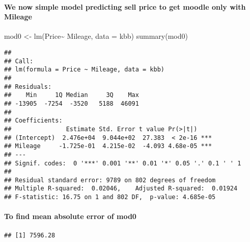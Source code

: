 \documentclass[
]{article}
\newenvironment{Shaded}{\begin{snugshade}}{\end{snugshade}}
\newcommand{\AttributeTok}[1]{\textcolor[rgb]{0.77,0.63,0.00}{#1}}
\newcommand{\FunctionTok}[1]{\textcolor[rgb]{0.00,0.00,0.00}{#1}}
\newcommand{\NormalTok}[1]{#1}
\newcommand{\OtherTok}[1]{\textcolor[rgb]{0.56,0.35,0.01}{#1}}
\newcommand{\SpecialCharTok}[1]{\textcolor[rgb]{0.00,0.00,0.00}{#1}}
\begin{document}
\hypertarget{we-now-simple-model-predicting-sell-price-to-get-moodle-only-with-mileage}{%
\paragraph{We now simple model predicting sell price to get moodle only
with
Mileage}\label{we-now-simple-model-predicting-sell-price-to-get-moodle-only-with-mileage}}

\begin{Shaded}
\begin{Highlighting}[]
\NormalTok{mod0 }\OtherTok{\textless{}{-}} \FunctionTok{lm}\NormalTok{(Price}\SpecialCharTok{\textasciitilde{}}\NormalTok{ Mileage, }\AttributeTok{data =}\NormalTok{ kbb)}
\FunctionTok{summary}\NormalTok{(mod0)}
\end{Highlighting}
\end{Shaded}

\begin{verbatim}
## 
## Call:
## lm(formula = Price ~ Mileage, data = kbb)
## 
## Residuals:
##    Min     1Q Median     3Q    Max 
## -13905  -7254  -3520   5188  46091 
## 
## Coefficients:
##               Estimate Std. Error t value Pr(>|t|)    
## (Intercept)  2.476e+04  9.044e+02  27.383  < 2e-16 ***
## Mileage     -1.725e-01  4.215e-02  -4.093 4.68e-05 ***
## ---
## Signif. codes:  0 '***' 0.001 '**' 0.01 '*' 0.05 '.' 0.1 ' ' 1
## 
## Residual standard error: 9789 on 802 degrees of freedom
## Multiple R-squared:  0.02046,    Adjusted R-squared:  0.01924 
## F-statistic: 16.75 on 1 and 802 DF,  p-value: 4.685e-05
\end{verbatim}

\hypertarget{to-find-mean-absolute-error-of-mod0}{%
\paragraph{To find mean absolute error of
mod0}\label{to-find-mean-absolute-error-of-mod0}}

\begin{Shaded}
\end{Shaded}

\begin{verbatim}
## [1] 7596.28
\end{verbatim}
\end{document}
